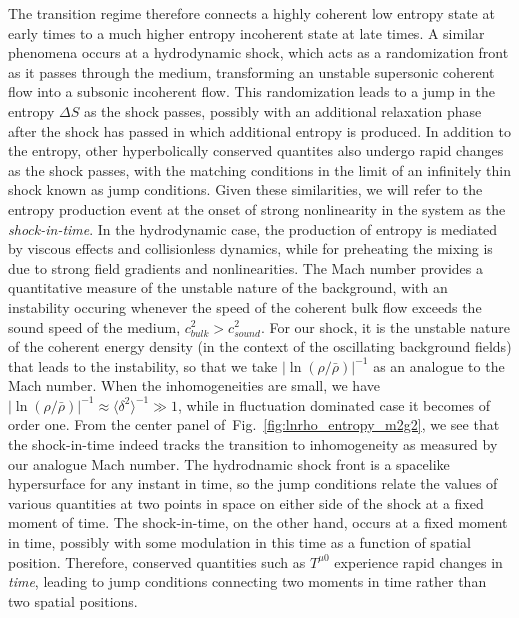\documentclass[11pt,a4paper]{article}
\newcommand{\figref}[1]{Fig.~\ref{#1}}
\begin{document}
The transition regime therefore connects a highly coherent low entropy state at early times to a much higher entropy incoherent state at late times.
A similar phenomena occurs at a hydrodynamic shock, which acts as a randomization front as it passes through the medium, transforming an unstable supersonic coherent flow into a subsonic incoherent flow.
This randomization leads to a jump in the entropy $\Delta S$ as the shock passes, possibly with an additional relaxation phase after the shock has passed in which additional entropy is produced.
In addition to the entropy, other hyperbolically conserved quantites also undergo rapid changes as the shock passes, with the matching conditions in the limit of an infinitely thin shock known as jump conditions.
Given these similarities, we will refer to the entropy production event at the onset of strong nonlinearity in the system as the \emph{shock-in-time}.
In the hydrodynamic case, the production of entropy is mediated by viscous effects and collisionless dynamics, 
while for preheating the mixing is due to strong field gradients and nonlinearities.
The Mach number provides a quantitative measure of the unstable nature of the background, with an instability occuring whenever the speed of the coherent bulk flow exceeds the sound speed of the medium, $c_{bulk}^2 > c_{sound}^2$.
For our shock, it is the unstable nature of the coherent energy density (in the context of the oscillating background fields) that leads to the instability,
so that we take $|\ln(\rho/\bar{\rho})|^{-1}$ as an analogue to the Mach number.
When the inhomogeneities are small, we have $|\ln(\rho/\bar{\rho})|^{-1} \approx \langle\delta^2\rangle^{-1} \gg 1$, while in fluctuation dominated case it becomes of order one.
From the center panel of~\figref{fig:lnrho_entropy_m2g2}, we see that the shock-in-time indeed tracks the transition to inhomogeneity as measured by our analogue Mach number.
The hydrodnamic shock front is a spacelike hypersurface for any instant in time, so the jump conditions relate the values of various quantities at two points in space on either side of the shock at a fixed moment of time.
The shock-in-time, on the other hand, occurs at a fixed moment in time, possibly with some modulation in this time as a function of spatial position.
Therefore, conserved quantities such as $T^{\mu 0}$ experience rapid changes in \emph{time}, leading to jump conditions connecting two moments in time rather than two spatial positions.
\end{document}
